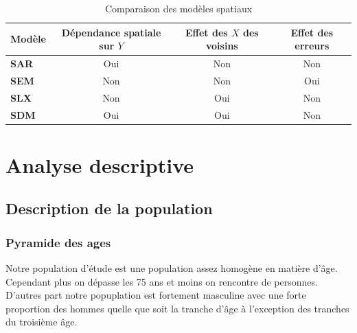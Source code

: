 \documentclass[
]{article}
\begin{document}
\begin{table}[h]
    \centering
    \begin{tabular}{|l|c|c|c|}
        \hline
        \textbf{Modèle} & \textbf{Dépendance spatiale sur \( Y \)} & \textbf{Effet des \( X \) des voisins} & \textbf{Effet des erreurs} \\
        \hline
        \textbf{SAR}  & Oui  & Non  & Non \\
        \hline
        \textbf{SEM}  & Non  & Non  & Oui \\
        \hline
        \textbf{SLX}  & Non  & Oui  & Non \\
        \hline
        \textbf{SDM}  & Oui  & Oui  & Non \\
        \hline
    \end{tabular}
    \caption{Comparaison des modèles spatiaux}
    \label{tab:comparaison_modeles}
\end{table}

\hypertarget{analyse-descriptive}{%
\section{Analyse descriptive}\label{analyse-descriptive}}

\hypertarget{description-de-la-population}{%
\subsection{Description de la
population}\label{description-de-la-population}}

\hypertarget{pyramide-des-ages}{%
\subsubsection{Pyramide des ages}\label{pyramide-des-ages}}

Notre population d'étude est une population assez homogène en matière
d'âge. Cependant plus on dépasse les 75 ans et moins on rencontre de
personnes. D'autres part notre popuplation est fortement masculine avec
une forte proportion des hommes quelle que soit la tranche d'âge à
l'exception des tranches du troisième âge.
\end{document}
